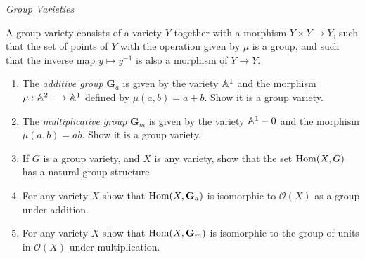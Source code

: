 \label{1.3.21}

\emph{Group Varieties}

A group variety consists of a variety $Y$ together with a morphism $Y \times Y \longrightarrow Y$, such that the set of points of $Y$ with the operation given by $\mu$ is a group, and such that the inverse map $y \mapsto y^{-1}$ is also a morphism of $Y \longrightarrow Y$.

\begin{enumerate}[label = (\alph*)]
    \item The \emph{additive group} $\mathbf G_{a}$ is given by the variety $\mathbb A^1$ and the morphism $\mu: \mathbb A^2 \longrightarrow \mathbb A^1$ defined by $\mu(a, b) = a + b$. Show it is a group variety.

    \item The \emph{multiplicative group} $\mathbf G_m$ is given by the variety $\mathbb A^1 - 0$ and the morphism $\mu(a, b) = ab$. Show it is a group variety.

    \item If $G$ is a group variety, and $X$ is any variety, show that the set $\operatorname{Hom}(X, G)$ has a natural group structure.

    \item For any variety $X$ show that $\operatorname{Hom}(X, \mathbf G_a)$ is isomorphic to $\mathcal O(X)$ as a group under addition.

    \item For any variety $X$ show that $\operatorname{Hom}(X, \mathbf G_m)$ is isomorphic to the group of units in $\mathcal O(X)$ under multiplication.
\end{enumerate}

